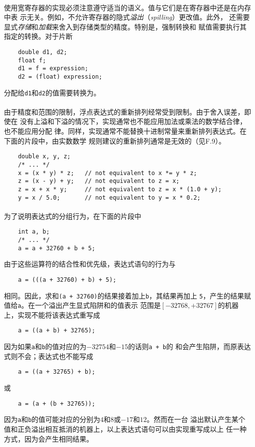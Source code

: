 \paragraph{}
\ex 使用宽寄存器的实现必须注意遵守适当的语义。值与它们是在寄存器中还是在内存中表
示无关。例如，不允许寄存器的隐式\textit{溢出}（\textit{spilling}）更改值。此外，
还需要显式\textit{存储}和\textit{加载}来舍入到存储类型的精度。特别是，强制转换和
赋值需要执行其指定的转换。对于片断
\begin{lstlisting}
    double d1, d2;
    float f;
    d1 = f = expression;
    d2 = (float) expression;
\end{lstlisting}
分配给\texttt{d1}和\texttt{d2}的值需要转换为。

\paragraph{}
\ex 由于精度和范围的限制，浮点表达式的重新排列经常受到限制。由于舍入误差，即使在
没有上溢和下溢的情况下，实现通常也不能应用加法或乘法的数学结合律，也不能应用分配
律。同样，实现通常不能替换十进制常量来重新排列表达式。在下面的片段中，由实数数学
规则建议的重新排列通常是无效的（见F.9）。
\begin{lstlisting}
    double x, y, z;
    /* ... */
    x = (x * y) * z;   // not equivalent to x *= y * z;
    z = (x - y) + y;   // not equivalent to z = x;
    z = x + x * y;     // not equivalent to z = x * (1.0 + y);
    y = x / 5.0;       // not equivalent to y = x * 0.2;
\end{lstlisting}

\paragraph{}
\ex 为了说明表达式的分组行为，在下面的片段中
\begin{lstlisting}
    int a, b;
    /* ... */
    a = a + 32760 + b + 5;
\end{lstlisting}
由于这些运算符的结合性和优先级，表达式语句的行为与
\begin{lstlisting}
    a = (((a + 32760) + b) + 5);
\end{lstlisting}
相同。因此，求和\texttt{(a + 32760)}的结果接着加上\texttt{b}，其结果再加上
\texttt{5}，产生的结果赋值给\texttt{a}。在一个溢出产生显式陷阱和的值表示
范围是$[-32768, +32767]$的机器上，实现不能将该表达式重写成
\begin{lstlisting}
    a = ((a + b) + 32765);
\end{lstlisting}
因为如果\texttt{a}和\texttt{b}的值对应的为$-32754$和$-15$的话则\texttt{a + b}的
和会产生陷阱，而原表达式则不会；表达式也不能写成
\begin{lstlisting}
    a = ((a + 32765) + b);
\end{lstlisting}
或
\begin{lstlisting}
    a = (a + (b + 32765));
\end{lstlisting}
因为\texttt{a}和\texttt{b}的值可能对应的分别为$4$和$8$或$-17$和$12$。然而在一台
溢出默认产生某个值和正负溢出相互抵消的机器上，以上表达式语句可以由实现重写成以上
任一种方式，因为会产生相同结果。

